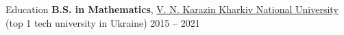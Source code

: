 \begin{rSection}{Education}
    {\bf B.S. in Mathematics}, \href{https://univer.kharkov.ua/en}{V. N. Karazin Kharkiv National University} (top 1 tech university in Ukraine) \hfill {2015 -- 2021}
\end{rSection}
